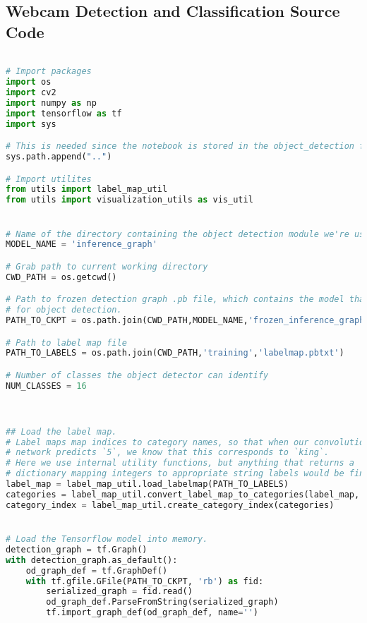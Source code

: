 \begin{appendices}
\chapter{Webcam Detection and Classification Source Code}

\begin{lstlisting}[language=Python, caption=Webcam Detection and Classification]

# Import packages
import os
import cv2
import numpy as np
import tensorflow as tf
import sys

# This is needed since the notebook is stored in the object_detection folder.
sys.path.append("..")

# Import utilites
from utils import label_map_util
from utils import visualization_utils as vis_util


# Name of the directory containing the object detection module we're using
MODEL_NAME = 'inference_graph'

# Grab path to current working directory
CWD_PATH = os.getcwd()

# Path to frozen detection graph .pb file, which contains the model that is used
# for object detection.
PATH_TO_CKPT = os.path.join(CWD_PATH,MODEL_NAME,'frozen_inference_graph.pb')

# Path to label map file
PATH_TO_LABELS = os.path.join(CWD_PATH,'training','labelmap.pbtxt')

# Number of classes the object detector can identify
NUM_CLASSES = 16



## Load the label map.
# Label maps map indices to category names, so that when our convolution
# network predicts `5`, we know that this corresponds to `king`.
# Here we use internal utility functions, but anything that returns a
# dictionary mapping integers to appropriate string labels would be fine
label_map = label_map_util.load_labelmap(PATH_TO_LABELS)
categories = label_map_util.convert_label_map_to_categories(label_map, max_num_classes=NUM_CLASSES, use_display_name=True)
category_index = label_map_util.create_category_index(categories)


# Load the Tensorflow model into memory.
detection_graph = tf.Graph()
with detection_graph.as_default():
	od_graph_def = tf.GraphDef()
	with tf.gfile.GFile(PATH_TO_CKPT, 'rb') as fid:
		serialized_graph = fid.read()
		od_graph_def.ParseFromString(serialized_graph)
		tf.import_graph_def(od_graph_def, name='')


\end{lstlisting}
\end{appendices}
